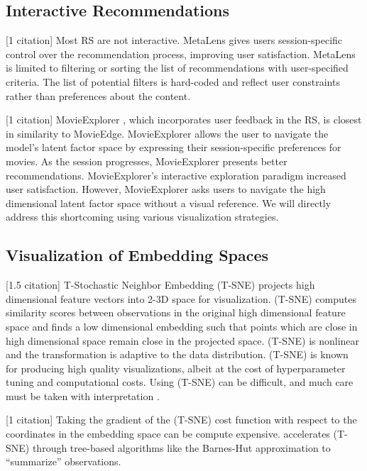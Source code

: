 \subsection{Interactive Recommendations}

[1 citation] Most RS are not interactive. MetaLens \cite{schafer2002meta}gives users session-specific control over the recommendation process, improving user satisfaction. MetaLens is limited to filtering or sorting the list of recommendations with user-specified criteria. The list of potential filters is hard-coded and reflect user constraints rather than preferences about the content. 

[1 citation] MovieExplorer \cite{taijala2018movieexplorer}, which incorporates user feedback in the RS, is closest in similarity to MovieEdge. MovieExplorer allows the user to navigate the model's latent factor space by expressing their session-specific preferences for movies.  As the session progresses, MovieExplorer presents better recommendations. MovieExplorer’s interactive exploration paradigm increased user satisfaction. However, MovieExplorer asks users to navigate the high dimensional latent factor space without a visual reference. We will directly address this shortcoming using various visualization strategies.

\subsection{Visualization of Embedding Spaces}

[1.5 citation] T-Stochastic Neighbor Embedding \mbox{(T-SNE)} \cite{maaten2008visualizing} projects high dimensional feature vectors into 2-3D space for visualization. \mbox{(T-SNE)} computes similarity scores between observations in the original high dimensional feature space and finds a low dimensional embedding such that points which are close in high dimensional space remain close in the projected space. \mbox{(T-SNE)} is nonlinear and the transformation is adaptive to the data distribution. \mbox{(T-SNE)} is known for producing high quality visualizations, albeit at the cost of hyperparameter tuning and computational costs. Using \mbox{(T-SNE)} can be difficult, and much care must be taken with interpretation \cite{wattenberg2016how}.

[1 citation] Taking the gradient of the \mbox{(T-SNE)} cost function with respect to the coordinates in the embedding space can be compute expensive.  \cite{van2014accelerating} accelerates \mbox{(T-SNE)} through tree-based algorithms like the Barnes-Hut approximation to “summarize” observations.  

